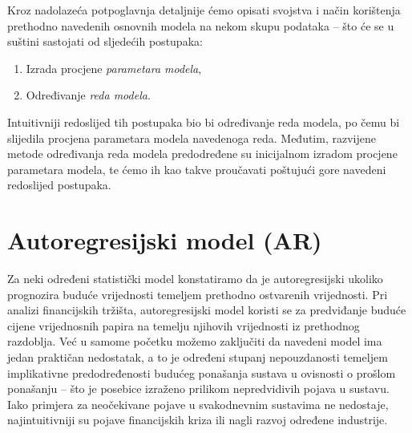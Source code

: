 \documentclass[a4paper,12pt,oneside]{memoir}
\begin{document}
        Kroz nadolazeća potpoglavnja detaljnije ćemo opisati svojstva i način korištenja prethodno navedenih osnovnih modela na nekom skupu podataka -- što će se u suštini sastojati od sljedećih postupaka:
        
        \begin{enumerate}
            \item Izrada procjene \textit{parametara modela},
            \item Određivanje \textit{reda modela}.
        \end{enumerate}

        Intuitivniji redoslijed tih postupaka bio bi određivanje reda modela, po čemu bi slijedila procjena parametara modela navedenoga reda. Međutim, razvijene metode određivanja reda modela predodređene su inicijalnom izradom procjene parametara modela, te ćemo ih kao takve proučavati poštujući gore navedeni redoslijed postupaka. \cite{Priestley}

        \section{Autoregresijski model (AR)}

            Za neki određeni statistički model konstatiramo da je autoregresijski ukoliko prognozira buduće vrijednosti temeljem prethodno ostvarenih vrijednosti. Pri analizi financijskih tržišta, autoregresijski model koristi se za predviđanje buduće cijene vrijednosnih papira na temelju njihovih vrijednosti iz prethodnog razdoblja. Već u samome početku možemo zaključiti da navedeni model ima jedan praktičan nedostatak, a to je određeni stupanj nepouzdanosti temeljem implikativne predodređenosti budućeg ponašanja sustava u ovisnosti o prošlom ponašanju -- što je posebice izraženo prilikom nepredvidivih pojava u sustavu. Iako primjera za neočekivane pojave u svakodnevnim sustavima ne nedostaje, najintuitivniji su pojave financijskih kriza ili nagli razvoj određene industrije.
\end{document}

